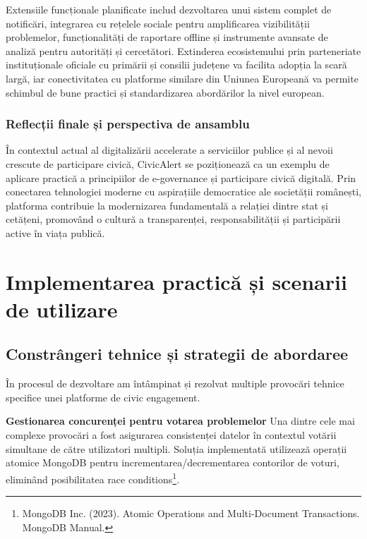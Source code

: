 \documentclass[12pt,a4paper]{report}
\begin{document}
Extensiile funcționale planificate includ dezvoltarea unui sistem complet de notificări, integrarea cu rețelele sociale pentru amplificarea vizibilității problemelor, funcționalități de raportare offline și instrumente avansate de analiză pentru autorități și cercetători. Extinderea ecosistemului prin parteneriate instituționale oficiale cu primării și consilii județene va facilita adopția la scară largă, iar conectivitatea cu platforme similare din Uniunea Europeană va permite schimbul de bune practici și standardizarea abordărilor la nivel european.

\subsection{Reflecții finale și perspectiva de ansamblu}

În contextul actual al digitalizării accelerate a serviciilor publice și al nevoii crescute de participare civică, CivicAlert se poziționează ca un exemplu de aplicare practică a principiilor de e-governance și participare civică digitală. Prin conectarea tehnologiei moderne cu aspirațiile democratice ale societății românești, platforma contribuie la modernizarea fundamentală a relației dintre stat și cetățeni, promovând o cultură a transparenței, responsabilității și participării active în viața publică.


\newpage
\chapter{Implementarea practică și scenarii de utilizare}


\section{Constrângeri tehnice și strategii de abordaree}

În procesul de dezvoltare am întâmpinat și rezolvat multiple provocări tehnice specifice unei platforme de civic engagement.

\textbf{Gestionarea concurenței pentru votarea problemelor}
Una dintre cele mai complexe provocări a fost asigurarea consistenței datelor în contextul votării simultane de către utilizatori multipli. Soluția implementată utilizează operații atomice MongoDB pentru incrementarea/decrementarea contorilor de voturi, eliminând posibilitatea race conditions\footnote{MongoDB Inc. (2023). Atomic Operations and Multi-Document Transactions. MongoDB Manual.}.
\end{document}
